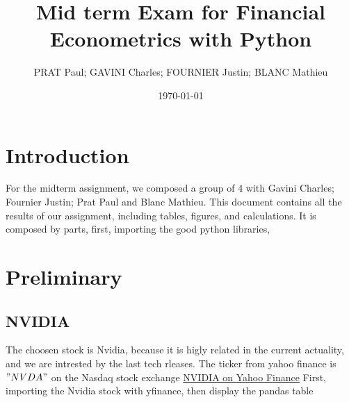 \documentclass{article}
\begin{document}
\title{Mid term Exam for Financial Econometrics with Python}
\author{PRAT Paul; GAVINI Charles; FOURNIER Justin; BLANC Mathieu}
\date{\today}

\maketitle %

\tableofcontents %

\section{Introduction}
For the midterm assignment, we composed a group of 4 with Gavini Charles; Fournier Justin; Prat Paul and Blanc Mathieu. 
This document contains all the results of our assignment, including tables, figures, and calculations. 
It is composed by  parts, first, importing the good python libraries,

\section{Preliminary}


\subsection{NVIDIA}

The choosen stock is Nvidia, because it is higly related in the current actuality, and we are intrested by the last tech rleases.
The ticker from yahoo finance is $"NVDA"$ on the Nasdaq stock exchange \href{https://finance.yahoo.com/quote/NVDA/.}{NVIDIA on Yahoo Finance}
First, importing the Nvidia stock with yfinance, then display the pandas table
\end{document}
